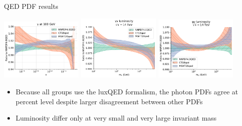 \documentclass[aspectratio=169, 8pt,t]{beamer}
\begin{document}
\begin{frame}{QED PDF results}
  \begin{center}
    \includegraphics[width=0.3\textwidth]{figures/photon_comparison.pdf}
    \includegraphics[width=0.3\textwidth]{figures/pp_lumi_comparison.png}
    \includegraphics[width=0.3\textwidth]{figures/gp_lumi_comparison.pdf}
  \end{center}
  \begin{itemize}
    \item Because all groups use the luxQED formalism, the photon PDFs agree at percent level despite larger disagreement between other PDFs
    \item Luminosity differ only at very small and very large invariant mass
  \end{itemize}
\end{frame}
\end{document}
